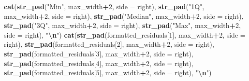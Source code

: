 \documentclass[
]{article}
\newenvironment{Shaded}{\begin{snugshade}}{\end{snugshade}}
\newcommand{\AttributeTok}[1]{\textcolor[rgb]{0.13,0.29,0.53}{#1}}
\newcommand{\DecValTok}[1]{\textcolor[rgb]{0.00,0.00,0.81}{#1}}
\newcommand{\FunctionTok}[1]{\textcolor[rgb]{0.13,0.29,0.53}{\textbf{#1}}}
\newcommand{\NormalTok}[1]{#1}
\newcommand{\SpecialCharTok}[1]{\textcolor[rgb]{0.81,0.36,0.00}{\textbf{#1}}}
\newcommand{\StringTok}[1]{\textcolor[rgb]{0.31,0.60,0.02}{#1}}
\begin{document}
\begin{Shaded}
\begin{Highlighting}[]
  \FunctionTok{cat}\NormalTok{(}\FunctionTok{str\_pad}\NormalTok{(}\StringTok{"Min"}\NormalTok{, max\_width}\SpecialCharTok{+}\DecValTok{2}\NormalTok{, }\AttributeTok{side =} \StringTok{\textquotesingle{}right\textquotesingle{}}\NormalTok{),}
      \FunctionTok{str\_pad}\NormalTok{(}\StringTok{"1Q"}\NormalTok{, max\_width}\SpecialCharTok{+}\DecValTok{2}\NormalTok{, }\AttributeTok{side =} \StringTok{\textquotesingle{}right\textquotesingle{}}\NormalTok{),}
      \FunctionTok{str\_pad}\NormalTok{(}\StringTok{"Median"}\NormalTok{, max\_width}\SpecialCharTok{+}\DecValTok{2}\NormalTok{, }\AttributeTok{side =} \StringTok{\textquotesingle{}right\textquotesingle{}}\NormalTok{),}
      \FunctionTok{str\_pad}\NormalTok{(}\StringTok{"3Q"}\NormalTok{, max\_width}\SpecialCharTok{+}\DecValTok{2}\NormalTok{, }\AttributeTok{side =} \StringTok{\textquotesingle{}right\textquotesingle{}}\NormalTok{),}
      \FunctionTok{str\_pad}\NormalTok{(}\StringTok{"Max"}\NormalTok{, max\_width}\SpecialCharTok{+}\DecValTok{2}\NormalTok{, }\AttributeTok{side =} \StringTok{\textquotesingle{}right\textquotesingle{}}\NormalTok{), }\StringTok{"}\SpecialCharTok{\textbackslash{}n}\StringTok{"}\NormalTok{)}
  \FunctionTok{cat}\NormalTok{(}\FunctionTok{str\_pad}\NormalTok{(formatted\_residuals[}\DecValTok{1}\NormalTok{], max\_width}\SpecialCharTok{+}\DecValTok{2}\NormalTok{, }\AttributeTok{side =} \StringTok{\textquotesingle{}right\textquotesingle{}}\NormalTok{),}
      \FunctionTok{str\_pad}\NormalTok{(formatted\_residuals[}\DecValTok{2}\NormalTok{], max\_width}\SpecialCharTok{+}\DecValTok{2}\NormalTok{, }\AttributeTok{side =} \StringTok{\textquotesingle{}right\textquotesingle{}}\NormalTok{),}
      \FunctionTok{str\_pad}\NormalTok{(formatted\_residuals[}\DecValTok{3}\NormalTok{], max\_width}\SpecialCharTok{+}\DecValTok{2}\NormalTok{, }\AttributeTok{side =} \StringTok{\textquotesingle{}right\textquotesingle{}}\NormalTok{),}
      \FunctionTok{str\_pad}\NormalTok{(formatted\_residuals[}\DecValTok{4}\NormalTok{], max\_width}\SpecialCharTok{+}\DecValTok{2}\NormalTok{, }\AttributeTok{side =} \StringTok{\textquotesingle{}right\textquotesingle{}}\NormalTok{),}
      \FunctionTok{str\_pad}\NormalTok{(formatted\_residuals[}\DecValTok{5}\NormalTok{], max\_width}\SpecialCharTok{+}\DecValTok{2}\NormalTok{, }\AttributeTok{side =} \StringTok{\textquotesingle{}right\textquotesingle{}}\NormalTok{), }\StringTok{"}\SpecialCharTok{\textbackslash{}n}\StringTok{"}\NormalTok{)}





\end{Highlighting}
\end{Shaded}
\end{document}
